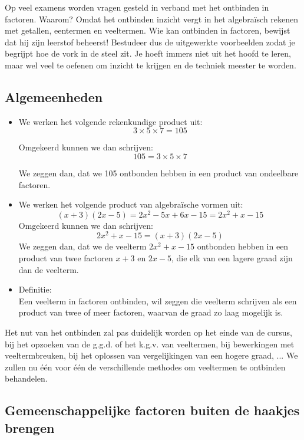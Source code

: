 \documentclass{bis}
\begin{document}

Op veel examens worden vragen gesteld in verband met het ontbinden in factoren. Waarom? Omdat het ontbinden inzicht vergt in het algebraïsch rekenen met getallen, eentermen en veeltermen.
Wie kan ontbinden in factoren, bewijst dat hij zijn leerstof beheerst!
Bestudeer dus de uitgewerkte voorbeelden zodat je begrijpt hoe de vork in de steel zit.
Je hoeft immers niet uit het hoofd te leren, maar wel veel te oefenen om inzicht te krijgen en de techniek meester te worden.

\subsection{Algemeenheden}

\begin{itemize}
  \item We werken het volgende rekenkundige product uit:
\[3\times 5\times 7 = 105\]

Omgekeerd kunnen we dan schrijven:
\[105 = 3\times 5\times 7\]

We zeggen dan, dat we 105 ontbonden hebben in een product van ondeelbare factoren.
  \item We werken het volgende product van algebraïsche vormen uit:
	\[(x + 3)(2x-5) = 2x^2 - 5x + 6x - 15 = 2x^2 + x - 15\]
	Omgekeerd kunnen we dan schrijven:
	\[2x^2 + x - 15 = (x + 3)(2x - 5)\]
	We zeggen dan, dat we de veelterm $2x^2 + x - 15$ ontbonden hebben in een product van twee factoren $x + 3$ en $2x - 5$, die elk van een lagere graad zijn dan de veelterm.
	
	\item Definitie:\\
	Een veelterm in factoren ontbinden, wil zeggen die veelterm schrijven als een product van twee of meer factoren, waarvan de graad zo laag mogelijk is.
\end{itemize}

Het nut van het ontbinden zal pas duidelijk worden op het einde van de cursus, bij het opzoeken van de g.g.d. of het k.g.v. van veeltermen, bij bewerkingen met veeltermbreuken, bij het oplossen van vergelijkingen van een hogere graad, ... We zullen nu één voor één de verschillende methodes om veeltermen te ontbinden behandelen.

\subsection{Gemeenschappelijke factoren buiten de haakjes brengen}
\end{document}
